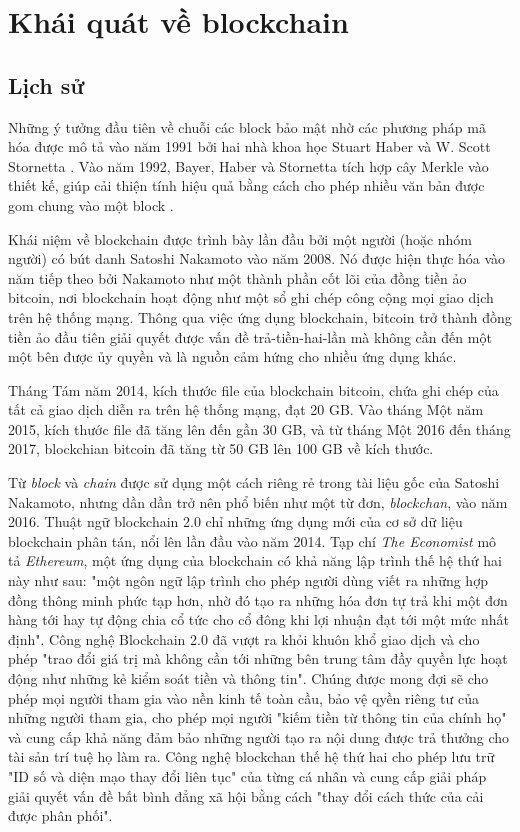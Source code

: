\chapter{Khái quát về blockchain}\label{ch:1}
\section{Lịch sử}

Những ý tưởng đầu tiên về chuỗi các block bảo mật nhờ các phương pháp mã hóa được mô tả vào năm 1991 bởi hai nhà khoa học Stuart Haber và W. Scott Stornetta \cite{haber}. Vào năm 1992, Bayer, Haber và Stornetta tích hợp cây Merkle  vào thiết kế, giúp cải thiện tính hiệu quả bằng cách cho phép nhiều văn bản được gom chung vào một block \cite{cryptocurrencytech}.

Khái niệm về blockchain được trình bày lần đầu bởi một người (hoặc nhóm người) có bút danh Satoshi Nakamoto  vào năm 2008. Nó được hiện thực hóa vào năm tiếp theo bởi Nakamoto như một thành phần cốt lõi của đồng tiền ảo bitcoin, nơi blockchain hoạt động như một sổ ghi chép công cộng mọi giao dịch trên hệ thống mạng. Thông qua việc ứng dụng  blockchain, bitcoin trở thành đồng tiền ảo đầu tiên giải quyết được vấn đề trả-tiền-hai-lần mà không cần đến một một bên được ủy quyền
và là nguồn cảm hứng cho  nhiều ứng dụng khác.

Tháng Tám năm 2014, kích thước file của blockchain bitcoin, chứa ghi chép của tất cả giao dịch diễn ra trên hệ thống mạng, đạt 20 GB. Vào tháng Một năm 2015, kích thước file đã tăng lên đến gần 30 GB, và từ tháng Một 2016 đến tháng 2017, blockchian bitcoin đã tăng từ 50 GB lên 100 GB về kích thước.

Từ \textit{block} và \textit{chain} được sử dụng một cách riêng rẻ trong tài liệu gốc của Satoshi Nakamoto, nhưng dần dần trở nên phổ biến như một từ đơn, \textit{blockchan}, vào năm 2016. Thuật ngữ blockchain 2.0 chỉ những ứng dụng mới của cơ sở dữ liệu blockchain phân tán, nổi lên lần đầu vào năm 2014. Tạp chí \textit{The Economist} mô tả \textit{Ethereum}, một ứng dụng của blockchain có khả năng lập trình thế hệ thứ hai này như sau: "một ngôn ngữ lập trình cho phép người dùng viết ra những hợp đồng thông minh phức tạp hơn, nhờ đó tạo ra những hóa đơn tự trả khi một đơn hàng tới hay tự động chia cổ tức cho cổ đông khi lợi nhuận đạt tới một mức nhất định". Công nghệ Blockchain 2.0 đã vượt ra khỏi khuôn khổ giao dịch và cho phép  "trao đổi giá trị mà không cần tới những bên trung tâm đầy quyền lực hoạt động như những kẻ kiểm soát tiền và thông tin". Chúng được mong đợi sẽ cho phép mọi người tham gia vào nền kinh tế toàn cầu, bảo vệ qyền riêng tư của những người tham gia, cho phép mọi người "kiếm tiền từ thông tin của chính họ" và cung cấp khả năng đảm bảo những người tạo ra nội dung được trả thưởng  cho tài sản trí tuệ họ làm ra. Công nghệ blockchan thế hệ thứ hai cho phép lưu trữ "ID số và diện mạo thay đổi liên tục" của từng cá nhân và cung cấp giải pháp giải quyết vấn đề bất bình đẳng xã hội bằng cách "thay đổi cách thức của cải được phân phối". 

